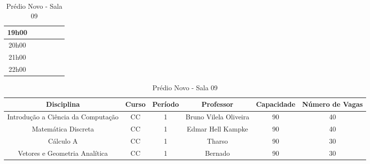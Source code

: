 \begin{apendices}
\begin{table}[!h]
\begin{adjustbox}{width=1\textwidth,center=\textwidth}
\begin{tabular}{|c|c|c|c|c|c|}
19h00 &  &  &  &  &  \\ \hline
20h00 &  &  &  &  &  \\ \hline
21h00 &  &  &  &  &  \\ \hline
22h00 &  &  &  &  &  \\ \hline
\end{tabular}
\end{adjustbox}
\begin{adjustbox}{width=1\textwidth,center=\textwidth}
\centering
\begin{tabular}{|c|c|c|c|c|c|}
\hline
\textbf{Disciplina} & \textbf{Curso} & \textbf{Período} & \textbf{Professor} & \textbf{Capacidade} & \textbf{Número de Vagas} \\ \hline
Introdução a Ciência da Computação & CC & 1 & Bruno Vilela Oliveira & 90 & 40 \\ \hline
Matemática Discreta & CC & 1 & Edmar Hell Kampke & 90 & 40 \\ \hline
Cálculo A & CC & 1 & Tharso & 90 & 30 \\ \hline
Vetores e Geometria Analítica & CC & 1 & Bernado & 90 & 30 \\ \hline
\end{tabular}
\end{adjustbox}
\caption{Prédio Novo - Sala 09}
\end{table}


\end{apendices}
